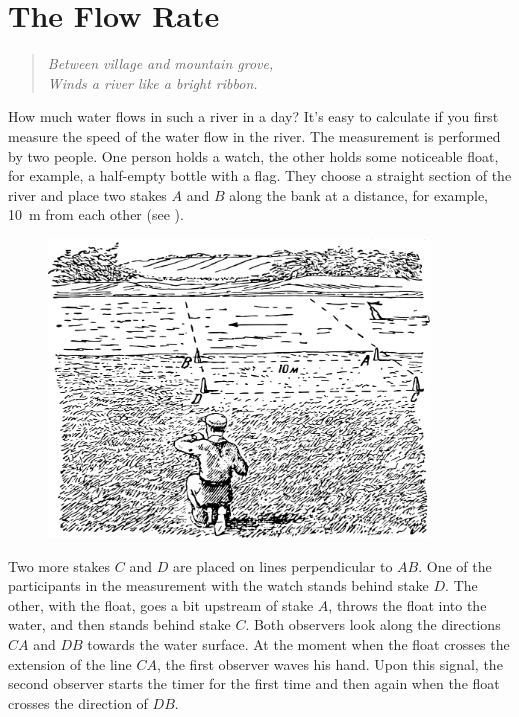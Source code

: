 \section{The Flow Rate}
\label{sec-2.7}
\begin{quote}
\emph{Between village and mountain grove,\\
Winds a river like a bright ribbon.}\\[-10pt]
\end{quote}

How much water flows in such a river in a day? It's easy to calculate if you first measure the speed of the water flow in the river. The measurement is performed by two people. One person holds a watch, the other holds some noticeable float, for example, a half-empty bottle with a flag. They choose a straight section of the river and place two stakes $A$ and $B$ along the bank at a distance, for example, \SI{10}{\meter} from each other (see ).

\begin{figure}[h!]
\centering
\includegraphics[width=0.9\textwidth]{figures/ch-02/fig-041.pdf}
\end{figure}

Two more stakes $C$ and $D$ are placed on lines perpendicular to $AB$. One of the participants in the measurement with the watch stands behind stake $D$. The other, with the float, goes a bit upstream of stake $A$, throws the float into the water, and then stands behind stake $C$. Both observers look along the directions $CA$ and $DB$ towards the water surface. At the moment when the float crosses the extension of the line $CA$, the first observer waves his hand. Upon this signal, the second observer starts the timer for the first time and then again when the float crosses the direction of $DB$.

